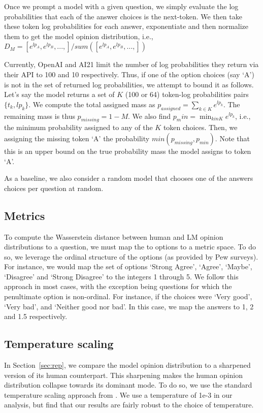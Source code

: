 Once we prompt a model with a given question, we simply evaluate the log probabilities that each of the answer choices is the next-token.
We then take these token log probabilities for each answer, exponentiate and then normalize them to get the model opinion distribution, i.e.,
$D_M = [e^{lp_A}, e^{lp_B}, ...,] / sum([e^{lp_A}, e^{lp_B}, ...,])$


Currently, OpenAI and AI21 limit the number of log probabilities they return via their API to 100 and 10 respectively.
Thus, if one of the option choices (say `A') is not in the set of returned log probabilities, we attempt to bound it as follows.
Let's say the model returns a set of $K$ (100 or 64) token-log probabilities pairs $\{t_k, lp_k\}$.
We compute the total assigned mass as $p_{assigned} = \sum_{k \in K} e^{lp_k}$. The remaining mass is thus $p_{missing} = 1 - M$. We also find $p_min = \min_{k in K}e^{lp_k}$, i.e., the minimum probability assigned to any of the $K$ token choices.
Then, we assigning the missing token `A' the probability $min(p_{missing}, p_{min})$. Note that this is an upper bound on the true probability mass the model assigns to token `A'.

As a baseline, we also consider a random model that chooses one of the answers choices per question at random.

\subsection{Metrics}
\label{app:metric}
To compute the Wasserstein distance between human and LM opinion distributions to a question, we must map the to options to a metric space.
To do so, we leverage the ordinal structure of the options (as provided by Pew surveys).
For instance, we would map the set of options `Strong Agree', `Agree', `Maybe', `Disagree' and `Strong Disagree' to the integers 1 through 5.
We follow this approach in most cases, with the exception being questions for which the penultimate option is non-ordinal. For instance, if the choices were `Very good', `Very bad', and `Neither good nor bad'. In this case, we map the answers to 1, 2 and 1.5 respectively.

\subsection{Temperature scaling}
\label{app:temp}

In Section~\ref{sec:rep}, we compare the model opinion distribution to a sharpened version of its human counterpart.
This sharpening makes the human opinion distribution collapse towards its dominant mode.
To do so, we use the standard temperature scaling approach from \citet{Guo17}.
We use a temperature of 1e-3 in our analysis, but find that our results are fairly robust to the choice of temperature.
